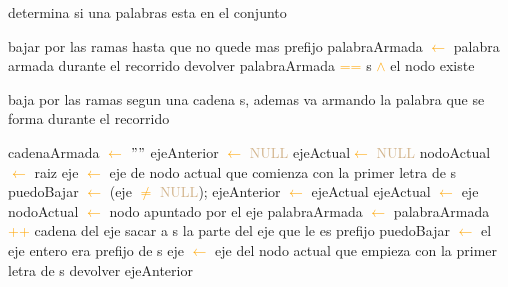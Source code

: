 \begin{algorithm}
\caption{determina si una palabras esta en el conjunto}
\begin{algorithmic}[1]
			\STATE bajar por las ramas hasta que no quede mas prefijo
			\STATE palabraArmada \textcolor{orange}{$\leftarrow$} palabra armada durante el recorrido
			\STATE devolver palabraArmada \textcolor{orange}{==} s \textcolor{orange}{$\wedge$} el nodo existe
\end{algorithmic}
\end{algorithm}		

\begin{algorithm}
\caption{baja por las ramas segun una cadena s, ademas va armando la palabra que se forma durante el recorrido }
\begin{algorithmic}[1]
\STATE cadenaArmada \textcolor{orange}{$\leftarrow$}  $""$
\STATE ejeAnterior \textcolor{orange}{$\leftarrow$}  \textcolor{Tan}{NULL}
\STATE ejeActual\textcolor{orange}{$\leftarrow$}  \textcolor{Tan}{NULL}
\STATE nodoActual \textcolor{orange}{$\leftarrow$} raiz
\STATE eje \textcolor{orange}{$\leftarrow$} eje de nodo actual que comienza con la primer letra de s
\STATE puedoBajar \textcolor{orange}{$\leftarrow$} (eje \textcolor{orange}{$\neq$} \textcolor{Tan}{NULL});
	\STATE ejeAnterior \textcolor{orange}{$\leftarrow$} ejeActual
	\STATE ejeActual \textcolor{orange}{$\leftarrow$} eje
	\STATE nodoActual \textcolor{orange}{$\leftarrow$} nodo apuntado por el eje
	\STATE palabraArmada \textcolor{orange}{$\leftarrow$} palabraArmada \textcolor{orange}{++} cadena del eje
	\STATE sacar a s la parte del eje que le es prefijo
	\STATE puedoBajar \textcolor{orange}{$\leftarrow$} el eje entero era prefijo de s
	\STATE eje \textcolor{orange}{$\leftarrow$} eje del nodo actual que empieza con la primer letra de s
\ENDWHILE
\STATE devolver ejeAnterior
\end{algorithmic}
\end{algorithm}	



